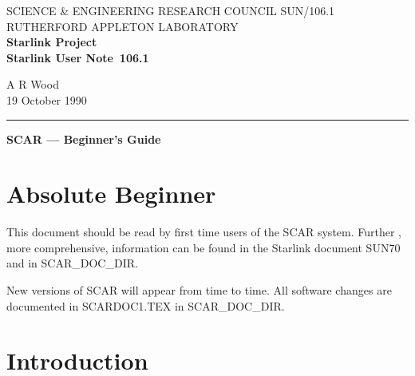 
\pagestyle{myheadings}

\newcommand{\stardoccategory}  {Starlink User Note}
\newcommand{\stardocinitials}  {SUN}
\newcommand{\stardocnumber}    {106.1}
\newcommand{\stardocauthors}   {A R Wood}
\newcommand{\stardocdate}      {19 October 1990}
\newcommand{\stardoctitle}     {SCAR --- Beginner's Guide}

\newcommand{\stardocname}{\stardocinitials /\stardocnumber}
\markright{\stardocname}
\setlength{\textwidth}{160mm}
\setlength{\textheight}{240mm}
\setlength{\topmargin}{-5mm}
\setlength{\oddsidemargin}{0mm}
\setlength{\evensidemargin}{0mm}
\setlength{\parindent}{0mm}
\setlength{\parskip}{\medskipamount}
\setlength{\unitlength}{1mm}


\thispagestyle{empty}
SCIENCE \& ENGINEERING RESEARCH COUNCIL \hfill \stardocname\\
RUTHERFORD APPLETON LABORATORY\\
{\large\bf Starlink Project\\}
{\large\bf \stardoccategory\ \stardocnumber}
\begin{flushright}
\stardocauthors\\
\stardocdate
\end{flushright}
\vspace{-4mm}
\rule{\textwidth}{0.5mm}
\vspace{5mm}
\begin{center}
{\Large\bf \stardoctitle}
\end{center}
\vspace{5mm}

\section {Absolute Beginner}

This document should be read by first time users of the SCAR system. Further 
, more comprehensive, information can be found in the Starlink document 
SUN70 and in SCAR\_DOC\_DIR.
 
New versions of SCAR will appear from time to time.
All software changes are documented in SCARDOC1.TEX in SCAR\_DOC\_DIR.

\section {Introduction}

